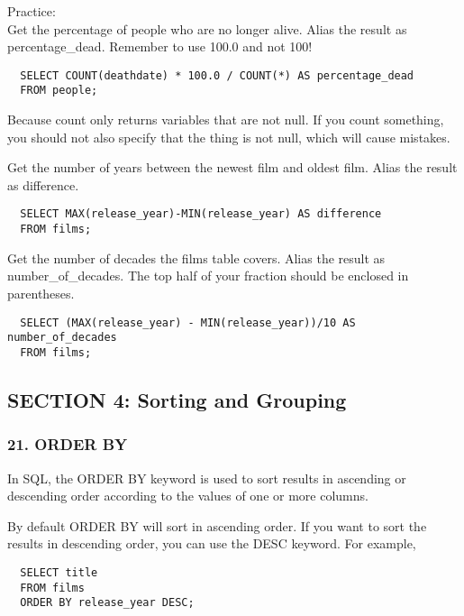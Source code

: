 \documentclass[
]{article}
\begin{document}
Practice:\\
Get the percentage of people who are no longer alive. Alias the result
as percentage\_dead. Remember to use 100.0 and not 100!

\begin{verbatim}
  SELECT COUNT(deathdate) * 100.0 / COUNT(*) AS percentage_dead
  FROM people;
\end{verbatim}

Because count only returns variables that are not null. If you count
something, you should not also specify that the thing is not null, which
will cause mistakes.

Get the number of years between the newest film and oldest film. Alias
the result as difference.

\begin{verbatim}
  SELECT MAX(release_year)-MIN(release_year) AS difference
  FROM films;
\end{verbatim}

Get the number of decades the films table covers. Alias the result as
number\_of\_decades. The top half of your fraction should be enclosed in
parentheses.

\begin{verbatim}
  SELECT (MAX(release_year) - MIN(release_year))/10 AS number_of_decades
  FROM films;
\end{verbatim}

\hypertarget{section-4-sorting-and-grouping}{%
\subsection{SECTION 4: Sorting and
Grouping}\label{section-4-sorting-and-grouping}}

\hypertarget{order-by}{%
\subsubsection{21. ORDER BY}\label{order-by}}

In SQL, the ORDER BY keyword is used to sort results in ascending or
descending order according to the values of one or more columns.

By default ORDER BY will sort in ascending order. If you want to sort
the results in descending order, you can use the DESC keyword. For
example,

\begin{verbatim}
  SELECT title
  FROM films
  ORDER BY release_year DESC;
\end{verbatim}
\end{document}
